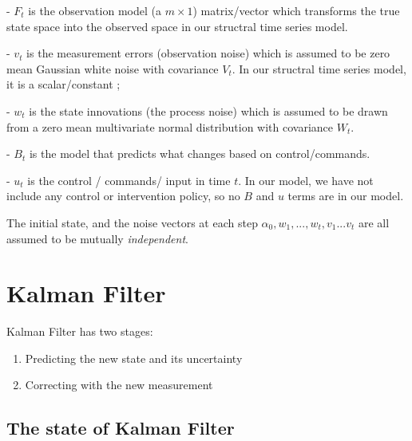 - $F_t$ is the observation model (a $m \times 1$)  matrix/vector which transforms the true state space into the observed space in our structral time series model. 







- $v_t$ is the measurement errors (observation noise) which is assumed to be zero mean Gaussian white noise with covariance $V_t$. In our structral time series model, it is a scalar/constant ;







- $w_t$ is the state innovations (the process noise) which is assumed to be drawn from a zero mean multivariate normal distribution with covariance $W_t$.







- $B_t$ is the model that predicts what changes based on  control/commands.







- $u_t$ is the control / commands/ input  in time $t$. In our model, we have not include any control or intervention policy, so no $B$ and $u$ terms are in our model. 




The initial state, and the noise vectors at each step ${\alpha_0, w_1, ..., w_t, v_1 ... v_t}$ are all assumed to be mutually \textit{independent}.





\section{Kalman Filter} 

Kalman Filter has two stages: 

\begin{enumerate}
	\item{Predicting the new state and its uncertainty}
	\item{Correcting with the new measurement}
\end{enumerate}





\subsection{The state of Kalman Filter}

